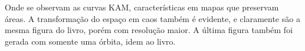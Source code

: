 \documentclass{article}[twocolumn]
\begin{document}
\begin{figure}[H]
	\end{figure}
	Onde se observam as curvas KAM, caracter\'isticas em mapas que preservam \'areas.
	A transforma\c{c}\~ao do espa\c{c}o em caos tamb\'em \'e evidente, e claramente
	s\~ao a mesma figura do livro, por\'em com resolu\c{c}\~ao maior. A \'ultima figura
	tamb\'em foi gerada com somente uma \'orbita, idem ao livro.
\end{document}
